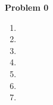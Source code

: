 {\bf Problem 0}
\begin{enumerate}
    \item 
    \item 
    \item 
    \item 
    \item 
    \item 
    \item 
\end{enumerate}
